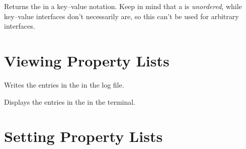 \documentclass[oneside]{book}
\let\tn=\cs
\begin{document}
\begin{function}{\propToKeyval}
\begin{syntax}
 
\end{syntax}
Returns the  in a key--value notation. Keep in mind
that a  is \emph{unordered}, while key--value interfaces
don't necessarily are, so this can't be used for arbitrary interfaces.
\begin{codehigh}
\propToKeyval \lTmpaProp
\end{codehigh}
\end{function}

\section{Viewing Property Lists}

\begin{function}{\propVarLog}
\begin{syntax}
 
\end{syntax}
Writes the entries in the  in the log file.
\begin{codehigh}
\propVarLog \lTmpaProp
\end{codehigh}
\end{function}

\begin{function}{\propVarShow}
\begin{syntax}
 
\end{syntax}
Displays the entries in the  in the terminal.
\begin{codehigh}
\propVarShow \lTmpaProp
\end{codehigh}
\end{function}

\section{Setting Property Lists}
\end{document}
